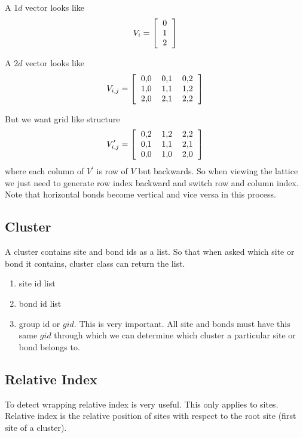 	A $1d$ vector looks like
	\begin{equation*}
	V_i = 
	\left[
	\begin{tabular}{c}
		0 \\ 1 \\ 2
	\end{tabular}
	\right]
	\end{equation*}
	
		A $2d$ vector looks like
	\begin{equation*}
	V_{i,j} = 
	\left[
	\begin{tabular}{cccc}
	0,0 & 0,1 & 0,2 \\
	1,0 & 1,1 & 1,2 \\
	2,0 & 2,1 & 2,2
	\end{tabular}
	\right]
	\end{equation*}
	
	But we want grid like structure 
	\begin{equation*}
	V^\prime_{i,j} = 
	\left[
	\begin{tabular}{cccc}
	0,2 & 1,2 & 2,2 \\
	0,1 & 1,1 & 2,1 \\
	0,0 & 1,0 & 2,0
	\end{tabular}
	\right]
	\end{equation*}
	where each column of $V^\prime$ is row of $V$ but backwards. So when viewing the lattice we just need to generate row index backward and  switch row and column index. Note that horizontal bonds become vertical and vice versa in this process.

	\subsection{Cluster}
	A cluster contains site and bond ids as a list. So that when asked which site or bond it contains, cluster class can return the list.
	\begin{enumerate}
		\item site id list
		\item bond id list
		\item group id or $gid$. This is very important. All site and bonds must have this same $gid$ through which we can determine which cluster a particular site or bond belongs to.
	\end{enumerate}

	\subsection{Relative Index}
	To detect wrapping relative index is very useful. This only applies to sites. Relative index is the relative position of sites with respect to the root site (first site of a cluster).
	
